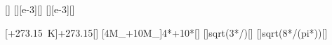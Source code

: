 [\degreeCelsius]
[\gram\per\mole][e-3][\kilogram\per\mole]
[\gram\per\mole][e-3][\kilogram\per\mole]

[\vartheta+\SI{273.15}{\kelvin}]{\thBX+273.15}[\kelvin]
[4M_+10M_]{4*\MCaX+10*\MHaX}[\kilogram\per\mole]
[]{sqrt(3*\ncRX*\TBuX/\MBuX)}[\mps]
[]{sqrt(8*\ncRX*\TBuX/(pi*\MBuX))}[\mps]
